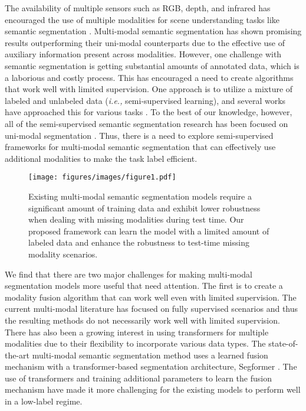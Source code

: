 \documentclass[10pt,twocolumn,letterpaper]{article}
\begin{document}
The availability of multiple sensors such as RGB, depth, and infrared has encouraged the use of multiple modalities for scene understanding tasks like semantic segmentation \cite{tokenfusion, cen, cfn, rdfnet, ssma, asymfusion, shapeconv}. Multi-modal semantic segmentation has shown promising results outperforming their uni-modal counterparts \cite{segformer, lin2017refinenet, chen2017rethinking} due to the effective use of auxiliary information present across modalities. However, one challenge with semantic segmentation is getting substantial amounts of annotated data, which is a  laborious and costly process. This has encouraged a need to create algorithms that work well with limited supervision. One approach is to utilize a mixture of labeled and unlabeled data (\textit{i.e.,} semi-supervised learning), and several works have approached this for various tasks \cite{liu2021unbiased, cai2022semi, weng2022semi, Liu_2022_CVPR}. To the best of our knowledge, however, all of the semi-supervised semantic segmentation research has been focused on uni-modal segmentation \cite{cct, gct, chen2021-CPS, u2pl, pc2seg, zou2020pseudoseg}. 
Thus, there is a need to explore semi-supervised frameworks for multi-modal semantic segmentation that can effectively use additional modalities to make the task label efficient.

\begin{figure}
\begin{center}
\texttt{[image: figures/images/figure1.pdf]}
\vspace{-6.5cm}
\end{center}
\caption{
Existing multi-modal semantic segmentation models require a significant amount of training data and exhibit lower robustness when dealing with missing modalities during test time. Our proposed framework can learn the model with a limited amount of labeled data and enhance the robustness to test-time missing modality scenarios.
}
\label{fig:teaser-figure}
\vspace{-3mm}
\end{figure}
 We find that there are two major challenges for making multi-modal segmentation models more useful that need attention. The first is to create a modality fusion algorithm that can work well even with limited supervision. 
The current multi-modal literature \cite{tokenfusion, cmx} has focused on fully supervised scenarios and thus the resulting methods do not necessarily work well with limited supervision. There has also been a growing interest in using transformers for multiple modalities due to their flexibility to incorporate various data types. The state-of-the-art multi-modal semantic segmentation method  \cite{tokenfusion} uses a learned fusion mechanism with a transformer-based segmentation architecture, Segformer \cite{segformer}. The use of transformers and training additional parameters to learn the fusion mechanism have made it more challenging for the existing models to perform well in a low-label regime. 
\end{document}
